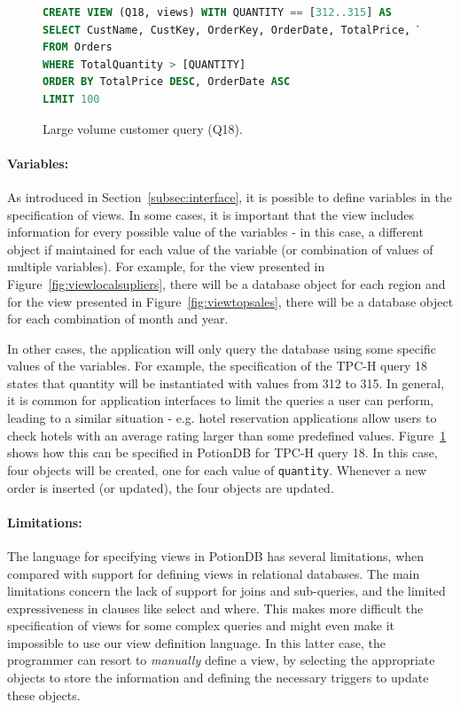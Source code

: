 \documentclass[sigplan,review,anonymous]{acmart}
\begin{document}
\begin{figure}[h]
	\begin{lstlisting}[language=SQL]
CREATE VIEW (Q18, views) WITH QUANTITY == [312..315] AS
SELECT CustName, CustKey, OrderKey, OrderDate, TotalPrice, TotalQuantity
FROM Orders
WHERE TotalQuantity > [QUANTITY]
ORDER BY TotalPrice DESC, OrderDate ASC
LIMIT 100
	\end{lstlisting}
	\caption{Large volume customer query (Q18).}
	\label{fig:q18_view}
\end{figure}


\paragraph{Variables:} As introduced in Section~\ref{subsec:interface}, it is possible to define 
variables in the specification of views. In some cases, it is important that the view includes information 
for every possible value of the variables - in this case, a different object if maintained for each
value of the variable (or combination of values of multiple variables). 
For example, for the view presented in Figure~\ref{fig:viewlocalsupliers}, there
will be a database object for each region and for the view presented in Figure~\ref{fig:viewtopsales}, there 
will be a database object for each combination of month and year.

In other cases, the application will only query the database using some specific values of the
variables. For example,  the specification of the TPC-H query 18 states that quantity will be instantiated with values
from 312 to 315. In general, it is common for application interfaces to limit the queries a user can perform, 
leading to a similar situation - e.g. hotel reservation applications allow users to check hotels with an average 
rating larger than some predefined values.
Figure~\ref{fig:q18_view} shows how this can be specified in PotionDB for TPC-H query 18. 
In this case, four objects will be created, one for each value of \texttt{quantity}. Whenever a new
order is inserted (or updated), the four objects are updated.

\paragraph{Limitations:} The language for specifying views in PotionDB has several limitations, when
compared with support for defining views in relational databases. The main limitations concern the 
lack of support for joins and sub-queries, and the limited expressiveness in clauses like select and where. 
This makes more difficult the specification of views for some complex queries and might even make it 
impossible to use our view definition language.  In this latter case, the programmer can resort to \emph{manually}
define a view, by selecting the appropriate objects to store the information and defining the necessary triggers
to update these objects.
\end{document}
